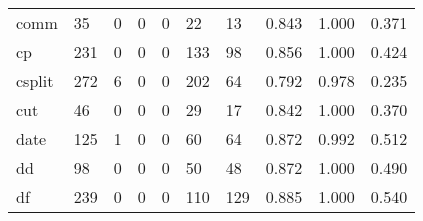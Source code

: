 \begin{longtable}{lp{2.0cm}p{2.0cm}p{2.0cm}p{2.0cm}p{2.0cm}p{2.0cm}p{2.0cm}p{2.0cm}p{2.0cm}}
comm      &                     35 &                                             0 &                                            0 &                                           0 &                                           22 &                                         13 &                                0.843 &                                  1.000 &                                0.371 \\
cp        &                    231 &                                             0 &                                            0 &                                           0 &                                          133 &                                         98 &                                0.856 &                                  1.000 &                                0.424 \\
csplit    &                    272 &                                             6 &                                            0 &                                           0 &                                          202 &                                         64 &                                0.792 &                                  0.978 &                                0.235 \\
cut       &                     46 &                                             0 &                                            0 &                                           0 &                                           29 &                                         17 &                                0.842 &                                  1.000 &                                0.370 \\
date      &                    125 &                                             1 &                                            0 &                                           0 &                                           60 &                                         64 &                                0.872 &                                  0.992 &                                0.512 \\
dd        &                     98 &                                             0 &                                            0 &                                           0 &                                           50 &                                         48 &                                0.872 &                                  1.000 &                                0.490 \\
df        &                    239 &                                             0 &                                            0 &                                           0 &                                          110 &                                        129 &                                0.885 &                                  1.000 &                                0.540 \\

\end{longtable}
